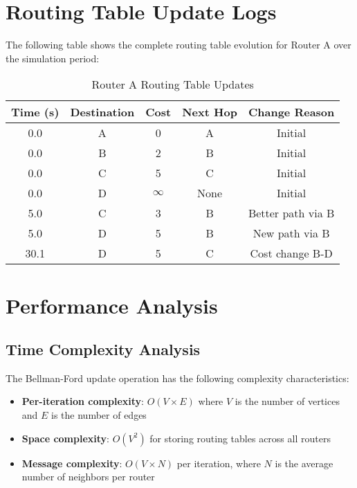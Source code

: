 \documentclass[12pt,a4paper]{article}
\begin{document}
\section{Routing Table Update Logs}

The following table shows the complete routing table evolution for Router A over the simulation period:

\begin{table}[H]
\centering
\caption{Router A Routing Table Updates}
\begin{tabular}{|c|c|c|c|c|}
\hline
\textbf{Time (s)} & \textbf{Destination} & \textbf{Cost} & \textbf{Next Hop} & \textbf{Change Reason} \\
\hline
0.0 & A & 0 & A & Initial \\
0.0 & B & 2 & B & Initial \\
0.0 & C & 5 & C & Initial \\
0.0 & D & $\infty$ & None & Initial \\
\hline
5.0 & C & 3 & B & Better path via B \\
5.0 & D & 5 & B & New path via B \\
\hline
30.1 & D & 5 & C & Cost change B-D \\
\hline
\end{tabular}
\end{table}

\section{Performance Analysis}

\subsection{Time Complexity Analysis}

The Bellman-Ford update operation has the following complexity characteristics:

\begin{itemize}
\item \textbf{Per-iteration complexity}: $O(V \times E)$ where $V$ is the number of vertices and $E$ is the number of edges
\item \textbf{Space complexity}: $O(V^2)$ for storing routing tables across all routers
\item \textbf{Message complexity}: $O(V \times N)$ per iteration, where $N$ is the average number of neighbors per router
\end{itemize}
\end{document}
